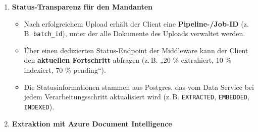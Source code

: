 \begin{enumerate}
\begin{itemize}
    \begin{itemize}
    \tightlist
    \item
      Falls \textbf{neu}: Dokument wird im \textbf{S3 Storage}
      gespeichert, in \textbf{Postgres} entsteht ein neuer Eintrag
      (\texttt{document\_id}, \texttt{tenant\_id},
      \texttt{content\_hash}, S3-Pfad, Status „RECEIVED``).\\
    \item
      Falls \textbf{Duplikat}: Es wird nur eine \textbf{weitere logische
      Referenz} (z.\,B. neue \texttt{document\_id} mit Verweis auf
      bestehendes physisches Dokument) angelegt; teure
      Verarbeitungsschritte können übersprungen oder wiederverwendet
      werden.
    \end{itemize}
  \item
    Parallel erzeugt der Data Service Events in Kafka (z.\,B.
    \texttt{document-received} / \texttt{document-to-extract}), wie in
    Abschnitt 4.1 beschrieben -- Duplikate können hier je nach Policy
    entweder \textbf{nicht} mehr in die Pipeline gegeben oder als
    „Shortcut`` markiert werden (z.\,B. nur Metadaten aktualisieren).
  \end{itemize}
\item
  \textbf{Status-Transparenz für den Mandanten}

  \begin{itemize}
  \tightlist
  \item
    Nach erfolgreichem Upload erhält der Client eine
    \textbf{Pipeline-/Job-ID} (z.\,B. \texttt{batch\_id}), unter der
    alle Dokumente des Uploads verwaltet werden.\\
  \item
    Über einen dedizierten Status-Endpoint der Middleware kann der
    Client den \textbf{aktuellen Fortschritt} abfragen (z.\,B. „20 \%
    extrahiert, 10 \% indexiert, 70 \% pending``).\\
  \item
    Die Statusinformationen stammen aus Postgres, das vom Data Service
    bei jedem Verarbeitungsschritt aktualisiert wird (z.\,B.
    \texttt{EXTRACTED}, \texttt{EMBEDDED}, \texttt{INDEXED}).
  \end{itemize}
\item
  \textbf{Extraktion mit Azure Document Intelligence}


\end{enumerate}
